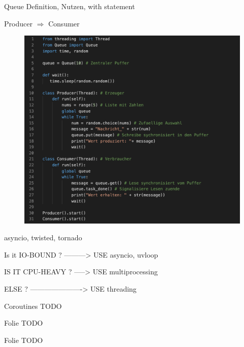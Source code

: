\begin{frame}{Queue}
   Definition, Nutzen, with statement
\end{frame}

\begin{frame}{Producer $\Rightarrow$  Consumer} %
     \begin{figure}[!htb]
        \includegraphics[scale=0.31]{6-python3/img/producerconsumer} 
    \end{figure}
\end{frame}

\begin{frame}{asyncio, twisted, tornado}

Is it IO-BOUND ? ---------> USE asyncio, uvloop

IS IT CPU-HEAVY ? -----> USE multiprocessing

ELSE ? ----------------------> USE threading
\end{frame}

\begin{frame}{Coroutines}
    TODO
\end{frame}

\begin{frame}{Folie}
    TODO
\end{frame}

\begin{frame}{Folie}
    TODO
\end{frame}

